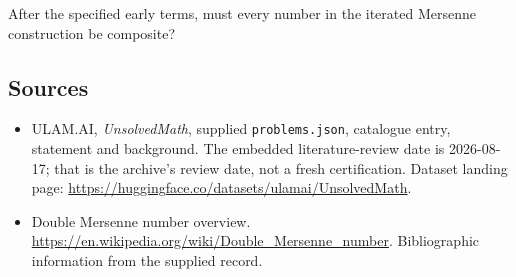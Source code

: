 \documentclass[11pt,a4paper]{article}
\begin{document}
After the specified early terms, must every number in the iterated Mersenne construction be composite?

\subsection{Sources}

{\small

\begin{itemize}

\item[\hypertarget{source:statement:1}{S1}] ULAM.AI, \emph{UnsolvedMath}, supplied \texttt{problems.json}, catalogue entry, statement and background. The embedded literature-review date is 2026-08-17; that is the archive’s review date, not a fresh certification. Dataset landing page: \url{https://huggingface.co/datasets/ulamai/UnsolvedMath}.

\item[\hypertarget{source:statement:2}{S2}] Double Mersenne number overview. \url{https://en.wikipedia.org/wiki/Double_Mersenne_number}. Bibliographic information from the supplied record.

\end{itemize}

}

\label{end:statement}
\end{document}
